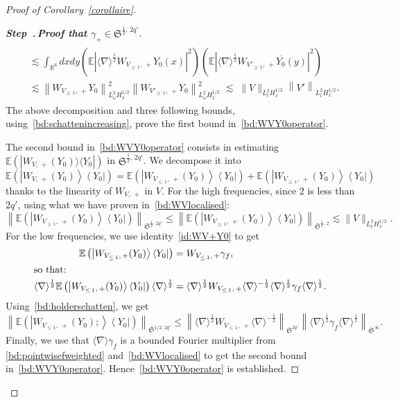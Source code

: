 \documentclass[AHL, Unicode, longabstracts,published]{cedram}
\newcommand{\R}{\mathbb{R}}
\newcommand{\E}{\mathbb{E}}
\newcommand{\frkS}{\mathfrak{S}}
\newcommand{\an}[1]{\langle #1 \rangle}
\newcounter{stepcount}
\newenvironment{step}[1]{\refstepcounter{stepcount}\begin{proof}[{\bf{Step~\thestepcount}{.\,\emph{#1}}}]}{\let\qed\relax\end{proof}}
\begin{document}
\begin{proof}[Proof of Corollary~\ref{corollaire}]
\begin{step}{{Proof that $\gamma_+\in \frkS^{\frac 12,\,2q'}$}}
\begin{multline*}
\begin{aligned}
&\lesssim \int_{\R^6}dxdy \left(\E \left|\langle \nabla \rangle^{\frac 12}W_{V_{\geq\,1},\,+}Y_0(x)\right|^2\right) \left(\E \left|\langle \nabla \rangle^{\frac 12}W_{V'_{\geq\,1},\,+}\overline{Y_0}(y)\right|^2 \right)\\
&\lesssim \left\| W_{V_{\geq\,1},\,+}Y_0\right\|_{L^2_\omega H^{1/2}_x}^2\left\| W_{V'_{\geq\,1},\,+}Y_0\right\|_{L^2_\omega H^{1/2}_x}^2 \; \lesssim \; \| V \|_{L^2_tH^{1/2}_x}\left\| V' \right\|_{L^2_tH^{1/2}_x}.
\end{aligned}
\end{multline*}
The above decomposition and three following bounds, using~\eqref{bd:schattenincreasing}, prove the first bound in~\eqref{bd:WVY0operator}.

The second bound in~\eqref{bd:WVY0operator} consists in estimating $\E(|W_{V,\,+}(Y_0)\rangle \langle Y_0|)$ in $\frkS^{\frac12,\,2q'}$. We decompose it into
\[
\E\left(\left|W_{V,\,+}(Y_0)\right\rangle \left\langle Y_0\right|\right) = \E\left(\left|W_{V_{\leq\,1},\,+}(Y_0)\right\rangle \left\langle Y_0\right|\right)+\E\left(\left|W_{V_{\geq\,1},\,+}(Y_0)\right\rangle \left\langle Y_0\right|\right)
\]
thanks to the linearity of $W_{V,\,+}$ in $V$. For the high frequencies, since $2$ is less than $2q'$, using what we have proven in~\eqref{bd:WVlocalised}:
\[
\left\|\E\left(\left|W_{V_{\geq\,1},\,+}(Y_0)\right\rangle \left\langle Y_0\right|\right)\right\|_{\frkS^{\frac12,\,2q'}} \leq \left\|\E\left(\left|W_{V_{\geq\,1},\,+}(Y_0)\right\rangle \left\langle Y_0\right|\right)\right\|_{\frkS^{\frac12,\,2}} \lesssim \|V\|_{L^2_tH^{1/2}_x}.
\]
For the low frequencies, we use identity~\eqref{id:WV+Y0} to get
\begin{align*}
\E\left(\left|W_{V_{\leq\,1},\,+}(Y_0)\right\rangle \left\langle Y_0\right|\right) &= W_{V_{\leq\,1},\,+}\gamma_f,
\\
\intertext{so that:}
\an{\nabla}^{\frac12} \E\left(\left|W_{V_{\leq\,1},\,+}(Y_0)\right\rangle \left\langle Y_0\right|\right) \an{\nabla}^{\frac12} &= \an{\nabla}^{\frac12} W_{V_{\leq\,1},\,+} \an{\nabla}^{-\frac12} \an{\nabla}^{\frac12} \gamma_f \an{\nabla}^{\frac12}.
\end{align*}
Using~\eqref{bd:holderschatten}, we get
\[
\left\|\E\left(\left|W_{V_{\leq\,1},\,+}(Y_0);\right\rangle \left\langle Y_0\right|\right)\right\|_{\frkS^{1/2,\,2q'}}\leq \left\|\an{\nabla}^{\frac12} W_{V_{\leq\,1},\,+} \an{\nabla}^{-\frac12} \right\|_{\frkS^{2q'}} \left\|\an{\nabla}^{\frac12} \gamma_f \an{\nabla}^{\frac12}\right\|_{\frkS^\infty}.
\]
Finally, we use that $\langle \nabla \rangle \gamma_f$ is a bounded Fourier multiplier from \eqref{bd:pointwisefweighted} and~\eqref{bd:WVlocalised} to get the second bound in~\eqref{bd:WVY0operator}. Hence~\eqref{bd:WVY0operator} is established.


\end{step}
\end{proof}
\end{document}

